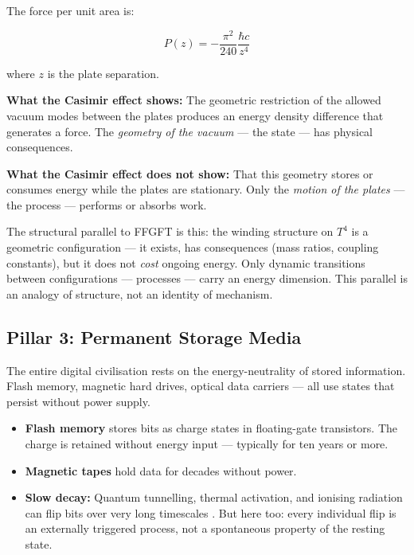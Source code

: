 The force per unit area is:

\begin{equation}
  P(z) = -\frac{\pi^2}{240}\frac{\hbar c}{z^4}
\end{equation}

where $z$ is the plate separation.

\textbf{What the Casimir effect shows:} The geometric restriction of
the allowed vacuum modes between the plates produces an energy density
difference that generates a force. The \emph{geometry of the vacuum}
— the state — has physical consequences.

\textbf{What the Casimir effect does not show:} That this geometry stores
or consumes energy while the plates are stationary. Only the
\emph{motion of the plates} — the process — performs or absorbs work.

The structural parallel to FFGFT is this: the winding structure on $T^4$ is a
geometric configuration — it exists, has consequences (mass ratios,
coupling constants), but it does not \emph{cost} ongoing energy. Only
dynamic transitions between configurations — processes — carry an energy
dimension. This parallel is an analogy of structure, not an identity of
mechanism.

\subsection{Pillar 3: Permanent Storage Media}

The entire digital civilisation rests on the energy-neutrality of stored
information. Flash memory, magnetic hard drives, optical data carriers —
all use states that persist without power supply.

\begin{itemize}
  \item \textbf{Flash memory} stores bits as charge states in
        floating-gate transistors. The charge is retained without energy
        input — typically for ten years or more.
  \item \textbf{Magnetic tapes} hold data for decades without power.
  \item \textbf{Slow decay:} Quantum tunnelling, thermal activation,
        and ionising radiation can flip bits over very long timescales
        \cite{Bez2003}. But here too: every individual flip is an
        externally triggered process, not a spontaneous property of
        the resting state.
\end{itemize}

